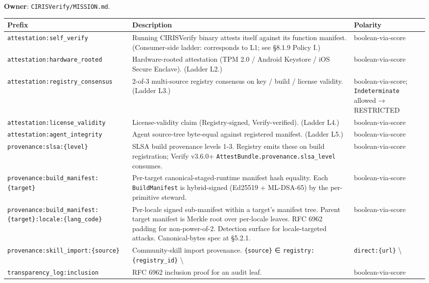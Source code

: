 \documentclass[10pt]{article}
\begin{document}
\textbf{Owner}: \texttt{CIRISVerify/MISSION.md}.


{\footnotesize
\begin{longtable}{|p{5.33cm}|p{5.33cm}|p{5.33cm}|}\hline
\textbf{Prefix} & \textbf{Description} & \textbf{Polarity} \\ \hline\endhead
\texttt{attestation:self\_verify} & Running CIRISVerify binary attests itself against its function manifest. (Consumer-side ladder: corresponds to L1; see §8.1.9 Policy I.) & boolean-via-score \\ \hline
\texttt{attestation:hardware\_rooted} & Hardware-rooted attestation (TPM 2.0 / Android Keystore / iOS Secure Enclave). (Ladder L2.) & boolean-via-score \\ \hline
\texttt{attestation:registry\_consensus} & 2-of-3 multi-source registry consensus on key / build / license validity. (Ladder L3.) & boolean-via-score; \texttt{Indeterminate} allowed → RESTRICTED \\ \hline
\texttt{attestation:license\_validity} & License-validity claim (Registry-signed, Verify-verified). (Ladder L4.) & boolean-via-score \\ \hline
\texttt{attestation:agent\_integrity} & Agent source-tree byte-equal against registered manifest. (Ladder L5.) & boolean-via-score \\ \hline
\texttt{provenance:slsa:\{level\}} & SLSA build provenance levels 1-3. Registry emits these on build registration; Verify v3.6.0+ \texttt{AttestBundle.provenance.slsa\_level} consumes. & boolean-via-score \\ \hline
\texttt{provenance:build\_manifest:\{target\}} & Per-target canonical-staged-runtime manifest hash equality. Each \texttt{BuildManifest} is hybrid-signed (Ed25519 + ML-DSA-65) by the per-primitive steward. & boolean-via-score \\ \hline
\texttt{provenance:build\_manifest:\{target\}:locale:\{lang\_code\}} & Per-locale signed sub-manifest within a target's manifest tree. Parent target manifest is Merkle root over per-locale leaves. RFC 6962 padding for non-power-of-2. Detection surface for locale-targeted attacks. Canonical-bytes spec at §5.2.1. & boolean-via-score \\ \hline
\texttt{provenance:skill\_import:\{source\}} & Community-skill import provenance. \texttt{\{source\}} ∈ \texttt{registry:\{registry\_id\}} \textbackslash{} & \texttt{direct:\{url\}} \textbackslash{} \\ \hline
\texttt{transparency\_log:inclusion} & RFC 6962 inclusion proof for an audit leaf. & boolean-via-score \\ \hline

\end{longtable}}
\end{document}
